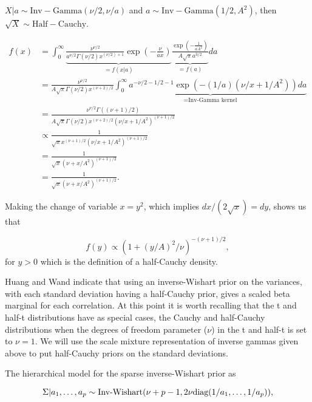 $X\vert a \sim \mathrm{Inv-Gamma}(\nu/2, \nu/a)$ and  $a \sim \mathrm{Inv-Gamma}(1/2,A^2)$, then $\sqrt{X}\sim \mathrm{Half-Cauchy}$. 

\begin{align*}
f(x) &= \int_0^\infty \underbrace{  \frac{\nu^{\nu/2}}{a^{\nu/2}\Gamma(\nu/2)x^{(\nu/2)+1}}\exp{(-\frac{\nu}{ax})}   }_{=f(x\vert a)} \underbrace{\frac{\exp{(-\frac{1}{aA^2})}}{A\sqrt{\pi}a^{3/2}}}_{=f(a)} da\\
&=\frac{\nu^{\nu/2}}{A\sqrt{\pi}\Gamma(\nu/2)x^{(\nu+2)/2}}\underbrace{\int_0^\infty a^{-\nu/2-1/2-1}\exp{(-(1/a)(\nu/x+1/A^2))}da}_{=\text{Inv-Gamma kernel}}\\
&=\frac{\nu^{\nu/2}\Gamma((\nu+1)/2)}{A\sqrt{\pi}\Gamma(\nu/2)x^{(\nu+2)/2}(\nu/x+1/A^2)^{(\nu+1)/2}}\\
&\propto \frac{1}{\sqrt{x}x^{(\nu+1)/2}(\nu/x+1/A^2)^{(\nu+1)/2}}\\
& =\frac{1}{\sqrt{x}(\nu+x/A^2)^{(\nu+1)/2}  }\\
&=\frac{1}{\sqrt{x}(\nu+x/A^2)^{(\nu+1)/2}  }.
\end{align*}

Making the change of variable $x=y^2$, which implies $dx/(2\sqrt{x})=dy$, shows us that 

\begin{equation}
f(y) \propto (1+(y/A)^2/\nu)^{-(\nu+1)/2},
\end{equation}
for $y>0$ which is the definition of a half-Cauchy density. 

Huang and Wand \cite{huang2013simple} indicate that using an inverse-Wishart prior on the variances, with each standard deviation having a half-Cauchy prior, gives a scaled beta marginal for each correlation. At this point it is worth recalling that the t and half-t distributions have as special cases, the Cauchy and half-Cauchy distributions when the degrees of freedom parameter ($\nu$) in the t and half-t is set to $\nu=1$. We will use the scale mixture representation of inverse gammas given above to put half-Cauchy priors on the standard deviations.  


The hierarchical model for the sparse inverse-Wishart prior as

\begin{equation}\newnot{symbol:inv_wishart}
\Sigma\vert a_1, \dots,a_p \sim \text{Inv-Wishart}(\nu+p-1, 2\nu\text{diag}(1/a_1,\dots,1/a_p)), 
\end{equation} 

